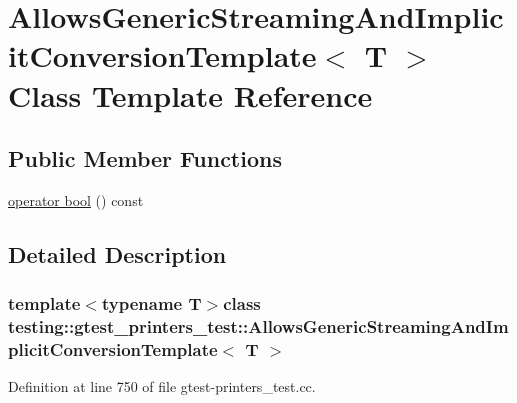 \hypertarget{classtesting_1_1gtest__printers__test_1_1AllowsGenericStreamingAndImplicitConversionTemplate}{\section{\-Allows\-Generic\-Streaming\-And\-Implicit\-Conversion\-Template$<$ \-T $>$ \-Class \-Template \-Reference}
\label{d2/d72/classtesting_1_1gtest__printers__test_1_1AllowsGenericStreamingAndImplicitConversionTemplate}
}
\subsection*{\-Public \-Member \-Functions}
\begin{DoxyCompactItemize}
\item 
\hyperlink{classtesting_1_1gtest__printers__test_1_1AllowsGenericStreamingAndImplicitConversionTemplate_aa385aa18f5e42db5a415c25a90f4193d}{operator bool} () const 
\end{DoxyCompactItemize}


\subsection{\-Detailed \-Description}
\subsubsection*{template$<$typename \-T$>$class testing\-::gtest\-\_\-printers\-\_\-test\-::\-Allows\-Generic\-Streaming\-And\-Implicit\-Conversion\-Template$<$ T $>$}



\-Definition at line 750 of file gtest-\/printers\-\_\-test.\-cc.



